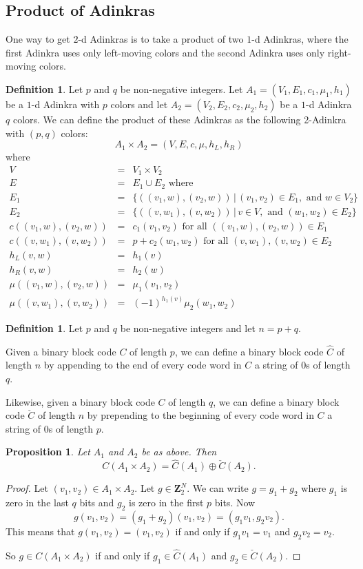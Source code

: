 \documentclass[12pt,twoside,singlespace]{article}
\numberwithin{equation}{section}
\newtheorem{prop}[equation]{Proposition}
\theoremstyle{definition}
\newtheorem{definition}[equation]{Definition}
\newcommand{\ZZ}{\mathbf{Z}}
\begin{document}
\subsection{Product of Adinkras}
One way to get $2$-d Adinkras is to take a product of two $1$-d Adinkras, where the first Adinkra uses only left-moving colors and the second Adinkra uses only right-moving colors.

\begin{definition}
Let $p$ and $q$ be non-negative integers.  Let $A_1=(V_1, E_1, c_1, \mu_1,h_1)$ be a $1$-d Adinkra with $p$ colors and let $A_2=(V_2, E_2, c_2, \mu_2,h_2)$ be a $1$-d Adinkra $q$ colors.  We can define the product of these Adinkras as the following 2-Adinkra with $(p,q)$ colors:
\[A_1\times A_2=(V,E,c,\mu,h_L,h_R)\]
where
\begin{eqnarray*}
V&=&V_1\times V_2\\
E&=&E_1\cup E_2\mbox{ where}\\
E_1&=&\{((v_1,w),(v_2,w))\,|\,(v_1, v_2)\in E_1,\mbox{ and } w\in V_2\}\\
E_2&=&\{((v,w_1),(v,w_2))\,|\,v\in V, \mbox{ and }(w_1,w_2)\in E_2\}\\
c((v_1,w),(v_2,w))&=&c_1(v_1,v_2)\mbox{ for all $((v_1,w),(v_2,w))\in E_1$}\\
c((v,w_1),(v,w_2))&=&p+c_2(w_1,w_2)\mbox{ for all $(v,w_1),(v,w_2)\in E_2$}\\
h_L(v,w)&=&h_1(v)\\
h_R(v,w)&=&h_2(w)\\
\mu((v_1,w),(v_2,w))&=&\mu_1(v_1,v_2)\\
\mu((v,w_1),(v,w_2))&=&(-1)^{h_1(v)}\mu_2(w_1,w_2)
\end{eqnarray*}
\end{definition}

\begin{definition}
Let $p$ and $q$ be non-negative integers and let $n=p+q$.

Given a binary block code $C$ of length $p$, we can define a binary block code $\hat{C}$ of length $n$ by appending to the end of every code word in $C$ a string of $0$s of length $q$.

Likewise, given a binary block code $C$ of length $q$, we can define a binary block code $\check{C}$ of length $n$ by prepending to the beginning of every code word in $C$ a string of $0$s of length $p$.
\end{definition}

\begin{prop}
Let $A_1$ and $A_2$ be as above.  Then
\[C(A_1\times A_2)=\hat{C}(A_1)\oplus \check{C}(A_2).\]
\end{prop}
\begin{proof}
Let $(v_1,v_2)\in A_1\times A_2$.  Let $g\in \ZZ_2^N$.  We can write $g=g_1+g_2$ where $g_1$ is zero in the last $q$ bits and $g_2$ is zero in the first $p$ bits.  Now
\[g(v_1,v_2)=(g_1+g_2)(v_1,v_2)=(g_1v_1,g_2v_2).\]
This means that $g(v_1,v_2)=(v_1,v_2)$ if and only if $g_1v_1=v_1$ and $g_2 v_2=v_2$.

So $g\in C(A_1\times A_2)$ if and only if $g_1\in \hat{C}(A_1)$ and $g_2\in \check{C}(A_2)$.
\end{proof}
\end{document}
